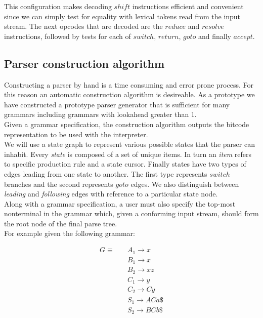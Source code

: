 \documentclass[a4paper,11pt]{article}
\begin{document}
This configuration makes decoding $shift$ instructions efficient and convenient since we can simply test for equality with lexical tokens read from the input stream. 
The next opcodes that are decoded are the $reduce$ and $resolve$ instructions, followed by tests for each of $switch$, $return$, $goto$ and finally $accept$.

\subsection{Parser construction algorithm}
Constructing a parser by hand is a time consuming and error prone process. For this reason an automatic construction algorithm is desireable.
As a prototype we have constructed a prototype parser generator that is sufficient for many grammars including grammars with lookahead greater than 1.\\
Given a grammar specification, the construction algorithm outputs the bitcode representation to be used with the interpreter.\\

We will use a state graph to represent various possible states that the parser can inhabit. 
Every \emph{state} is composed of a set of unique items. 
In turn an \emph{item} refers to specific production rule and a state cursor.
Finally states have two types of edges leading from one state to another. 
The first type represents $switch$ branches and the second represents $goto$ edges. We also distinguish between \emph{leading} and \emph{following} edges with reference to a particular state node.\\

Along with a grammar specification, a user must also specify the top-most nonterminal in the grammar which, given a conforming input stream, should form the root node of the final parse tree.\\
For example given the following grammar:

\parbox{.3\textwidth}{\begin{align*}
G \equiv \quad & A_1 \rightarrow x\\
               & B_1 \rightarrow x\\
               & B_2 \rightarrow x z\\
               & C_1 \rightarrow y\\
               & C_2 \rightarrow C y\\
               & S_1 \rightarrow A C a \$\\
               & S_2 \rightarrow B C b \$
\end{align*}}
\end{document}
